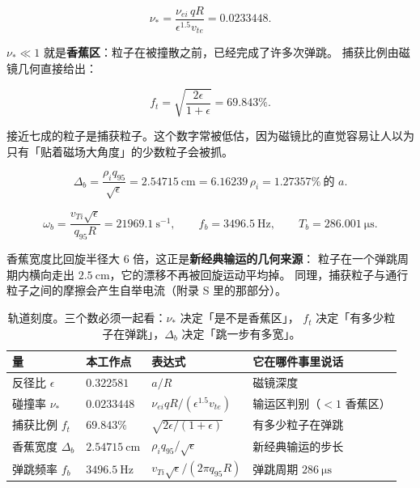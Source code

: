 \begin{equation}
\nu_*=\frac{\nu_{ei}\,qR}{\epsilon^{1.5}v_{te}}=0.0233448 .
\label{eq:app-ae-nustar}
\end{equation}

$\nu_*\ll1$ 就是\textbf{香蕉区}：粒子在被撞散之前，已经完成了许多次弹跳。
捕获比例由磁镜几何直接给出：

\begin{equation}
f_t=\sqrt{\frac{2\epsilon}{1+\epsilon}}=69.843\% .
\label{eq:app-ae-ftrap}
\end{equation}

接近七成的粒子是捕获粒子。这个数字常被低估，因为磁镜比的直觉容易让人以为
只有「贴着磁场大角度」的少数粒子会被抓。

\begin{equation}
\Delta_b=\frac{\rho_iq_{95}}{\sqrt{\epsilon}}=2.54715\ \mathrm{cm}
=6.16239\,\rho_i=1.27357\%\ \text{的 }a .
\label{eq:app-ae-banana}
\end{equation}

\begin{equation}
\omega_b=\frac{v_{Ti}\sqrt{\epsilon}}{q_{95}R}=21969.1\ \mathrm{s^{-1}},\qquad
f_b=3496.5\ \mathrm{Hz},\qquad
T_b=286.001\ \mathrm{\mu s} .
\label{eq:app-ae-bounce}
\end{equation}

香蕉宽度比回旋半径大 $6$ 倍，这正是\textbf{新经典输运的几何来源}：
粒子在一个弹跳周期内横向走出 $2.5\ \mathrm{cm}$，它的漂移不再被回旋运动平均掉。
同理，捕获粒子与通行粒子之间的摩擦会产生自举电流（附录 S 里的那部分）。

\begin{table}[htbp]
\centering
\small
\caption{轨道刻度。三个数必须一起看：$\nu_*$ 决定「是不是香蕉区」，
$f_t$ 决定「有多少粒子在弹跳」，$\Delta_b$ 决定「跳一步有多宽」。}
\label{tab:app-ae-orbit}
\begin{tabular}{p{3.2cm}p{3.0cm}p{3.4cm}p{4.2cm}}
\toprule
量 & 本工作点 & 表达式 & 它在哪件事里说话 \\
\midrule
反径比 $\epsilon$ & $0.322581$ & $a/R$ & 磁镜深度 \\
碰撞率 $\nu_*$ & $0.0233448$ & $\nu_{ei}qR/(\epsilon^{1.5}v_{te})$ & 输运区判别（$<1$ 香蕉区） \\
捕获比例 $f_t$ & $69.843\%$ & $\sqrt{2\epsilon/(1+\epsilon)}$ & 有多少粒子在弹跳 \\
香蕉宽度 $\Delta_b$ & $2.54715\ \mathrm{cm}$ & $\rho_iq_{95}/\sqrt{\epsilon}$ & 新经典输运的步长 \\
弹跳频率 $f_b$ & $3496.5\ \mathrm{Hz}$ & $v_{Ti}\sqrt{\epsilon}/(2\pi q_{95}R)$ & 弹跳周期 $286\ \mathrm{\mu s}$ \\
\bottomrule
\end{tabular}

\end{table}

